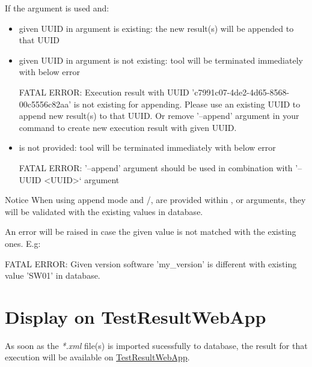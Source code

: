    If the argument  is used and:
    \begin{itemize}
      \item given UUID in  argument is existing: 
            the new result(s) will be appended to that UUID
      \item given UUID in  argument is not existing: 
            tool will be terminated immediately with below error
\begin{robotlog}
FATAL ERROR: Execution result with UUID 'c7991c07-4de2-4d65-8568-00c5556c82aa' is not existing for appending.
             Please use an existing UUID to append new result(s) to that UUID.
             Or remove '--append' argument in your command to create new execution result with given UUID.
\end{robotlog}
      \item {} is not provided: 
            tool will be terminated immediately with below error
\begin{robotlog}
FATAL ERROR: '--append' argument should be used in combination with '--UUID <UUID>` argument
\end{robotlog}
    \end{itemize} 

    \begin{boxhint} {Notice}
      When using append mode and /, 
       are provided within , 
       or  arguments, they will 
      be validated with the existing values in database. 

      An error will be raised in case the given value is not matched with the 
      existing ones. E.g:
\begin{robotlog}
FATAL ERROR: Given version software 'my_version' is different with existing value 'SW01' in database.
\end{robotlog}
    \end{boxhint}

\newpage
\hypertarget{display-on-testresultwebapp}{%
\section{Display on TestResultWebApp}\label{display-on-testresultwebapp}}

As soon as the \emph{*.xml} file(s) is imported sucessfully to database, 
the result for that execution will be available on
\href{https://github.com/test-fullautomation/testresultwebapp}{TestResultWebApp}.


